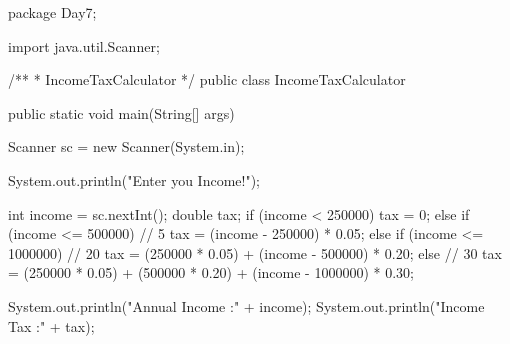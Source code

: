package Day7;

import java.util.Scanner;

/**
 * IncomeTaxCalculator
 */
public class IncomeTaxCalculator {
    public static void main(String[] args) {
        Scanner sc = new Scanner(System.in);

        System.out.println("Enter you Income!");

        int income = sc.nextInt();
        double tax;
        if (income < 250000) {
            tax = 0;
        } else if (income <= 500000) {
            // 5%
            tax = (income - 250000) * 0.05;
        } else if (income <= 1000000) {
            // 20%
            tax = (250000 * 0.05) + (income - 500000) * 0.20;
        } else {
            // 30%
            tax = (250000 * 0.05) + (500000 * 0.20) + (income - 1000000) * 0.30;
        }

        System.out.println("Annual Income :" + income);
        System.out.println("Income Tax :" + tax);

    }
}